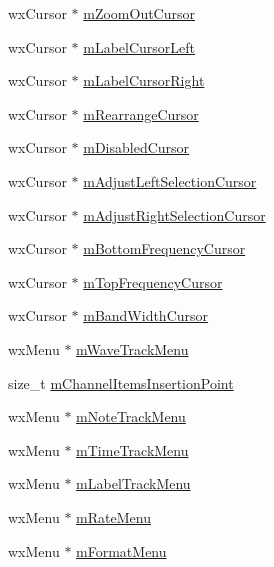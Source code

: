 \begin{DoxyCompactItemize}
\item 
wx\+Cursor $\ast$ \hyperlink{class_track_panel_a2e34ef324bc6b3ccb8229f644750aac8}{m\+Zoom\+Out\+Cursor}
\item 
wx\+Cursor $\ast$ \hyperlink{class_track_panel_a35f8f3d317049476e9aa1beff2a4fcfe}{m\+Label\+Cursor\+Left}
\item 
wx\+Cursor $\ast$ \hyperlink{class_track_panel_a24629f89f4075b5592bccf528b0b9ed7}{m\+Label\+Cursor\+Right}
\item 
wx\+Cursor $\ast$ \hyperlink{class_track_panel_a854ecb221e26a9f55cde793a134894d9}{m\+Rearrange\+Cursor}
\item 
wx\+Cursor $\ast$ \hyperlink{class_track_panel_a5552caee45635cb3bae1338fbe51b18c}{m\+Disabled\+Cursor}
\item 
wx\+Cursor $\ast$ \hyperlink{class_track_panel_a285bee406a7006b3446a184e4b82ef7a}{m\+Adjust\+Left\+Selection\+Cursor}
\item 
wx\+Cursor $\ast$ \hyperlink{class_track_panel_a3d6d67cfbb88101960b3854cc6ec14c2}{m\+Adjust\+Right\+Selection\+Cursor}
\item 
wx\+Cursor $\ast$ \hyperlink{class_track_panel_af59ffe3dcaa79ea7d3f650a77a3a668b}{m\+Bottom\+Frequency\+Cursor}
\item 
wx\+Cursor $\ast$ \hyperlink{class_track_panel_a870e2ab664262b1033b6ab96acc82c02}{m\+Top\+Frequency\+Cursor}
\item 
wx\+Cursor $\ast$ \hyperlink{class_track_panel_a94be9bdea6c34977d0d74514458468ab}{m\+Band\+Width\+Cursor}
\item 
wx\+Menu $\ast$ \hyperlink{class_track_panel_a7ff1b9a82a327967fb6f0ac60fd93016}{m\+Wave\+Track\+Menu}
\item 
size\+\_\+t \hyperlink{class_track_panel_a847d9d632b66b1f203b2ca2a8afde94e}{m\+Channel\+Items\+Insertion\+Point}
\item 
wx\+Menu $\ast$ \hyperlink{class_track_panel_ad273eaf93f9b710db1c9b52cddeeae84}{m\+Note\+Track\+Menu}
\item 
wx\+Menu $\ast$ \hyperlink{class_track_panel_afd5aba64f5cdfc8b0a58dbe52bd171af}{m\+Time\+Track\+Menu}
\item 
wx\+Menu $\ast$ \hyperlink{class_track_panel_ac64f12dd879989b2b08b7b99de33bfaf}{m\+Label\+Track\+Menu}
\item 
wx\+Menu $\ast$ \hyperlink{class_track_panel_ab6871e1e28183f7c71e2b2457e3036b8}{m\+Rate\+Menu}
\item 
wx\+Menu $\ast$ \hyperlink{class_track_panel_aed53844c5faeabefd25618317866160a}{m\+Format\+Menu}

\end{DoxyCompactItemize}

